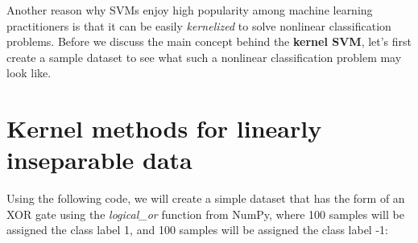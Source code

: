 \documentclass[11pt]{article}
\begin{document}
    Another reason why SVMs enjoy high popularity among machine learning
practitioners is that it can be easily \emph{kernelized} to solve
nonlinear classification problems. Before we discuss the main concept
behind the \textbf{kernel SVM}, let's first create a sample dataset to
see what such a nonlinear classification problem may look like.

    \section{Kernel methods for linearly inseparable
data}\label{kernel-methods-for-linearly-inseparable-data}

    Using the following code, we will create a simple dataset that has the
form of an XOR gate using the \emph{logical\_or} function from NumPy,
where 100 samples will be assigned the class label 1, and 100 samples
will be assigned the class label -1:
\end{document}
